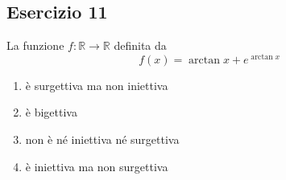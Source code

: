 \documentclass[12pt,a4paper]{article}
\begin{document}
\subsection*{Esercizio 11}
La funzione $f : \mathbb{R} \to \mathbb{R}$ definita da
\[
f(x) = \arctan x + e^{\arctan x}
\]
\begin{enumerate}
  \item è surgettiva ma non iniettiva
  \item è bigettiva
  \item non è né iniettiva né surgettiva
  \item è iniettiva ma non surgettiva
\end{enumerate}
\end{document}
